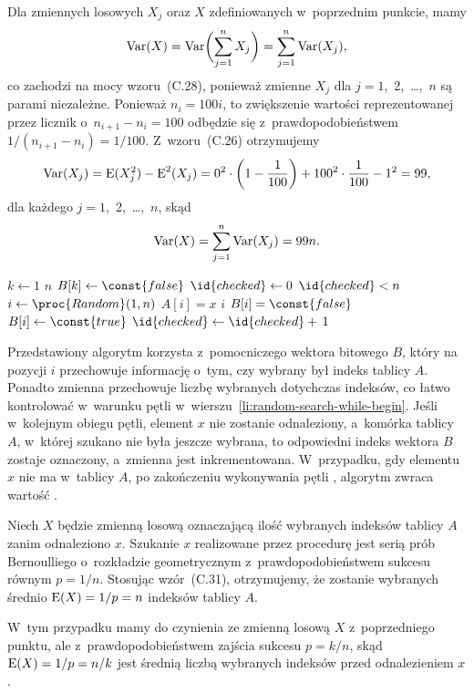 \subproblem %
Dla zmiennych losowych $X_j$ oraz $X$ zdefiniowanych w~poprzednim punkcie, mamy
\[
	\operatorname{Var}(X) = \operatorname{Var}\biggl(\sum_{j=1}^nX_j\biggr) = \sum_{j=1}^n\operatorname{Var}(X_j),
\]
co zachodzi na mocy wzoru~(C.28), ponieważ zmienne $X_j$ dla $j=1$,~2,~\dots,~$n$ są parami niezależne. Ponieważ $n_i=100i$, to zwiększenie wartości reprezentowanej przez licznik o~$n_{i+1}-n_i=100$ odbędzie się z~prawdopodobieństwem $1/(n_{i+1}-n_i)=1/100$. Z~wzoru~(C.26) otrzymujemy
\[
	\operatorname{Var}(X_j) = \operatorname{E}(X_j^2)-\operatorname{E}^2(X_j) = 0^2\cdot\left(1-\frac{1}{100}\right)+100^2\cdot\frac{1}{100}-1^2 = 99,
\]
dla każdego $j=1$,~2,~\dots,~$n$, skąd
\[
	\operatorname{Var}(X) = \sum_{j=1}^n\operatorname{Var}(X_j) = 99n.
\]


\subproblem %
\begin{codebox}
\li	\For $k\gets1$ \To $n$
\li		\Do
			$B[k]\gets\const{false}$
		\End
\li	$\id{checked}\gets0$
\li	\While $\id{checked}<n$ \label{li:random-search-while-begin}
\li		\Do
			$i\gets\proc{Random}(1,n)$
\li			\If $A[i]=x$
\li				\Then
					\Return $i$
\li				\ElseIf $B[i]=\const{false}$
\li					\Then
						$B[i]\gets\const{true}$
\li						$\id{checked}\gets\id{checked}+\,1$
				\End
		\End
\li	\Return {}
\end{codebox}
Przedstawiony algorytm korzysta z~pomocniczego wektora bitowego $B$, który na pozycji $i$ przechowuje informację o~tym, czy wybrany był  indeks tablicy $A$. Ponadto zmienna  przechowuje liczbę wybranych dotychczas indeksów, co łatwo kontrolować w~warunku pętli  w~wierszu~\ref{li:random-search-while-begin}. Jeśli w~kolejnym obiegu pętli, element $x$ nie zostanie odnaleziony, a~komórka tablicy $A$, w~której szukano nie była jeszcze wybrana, to odpowiedni indeks wektora $B$ zostaje oznaczony, a~zmienna  jest inkrementowana. W~przypadku, gdy elementu $x$ nie ma w~tablicy $A$, po zakończeniu wykonywania pętli , algorytm zwraca wartość .

\subproblem %
Niech $X$ będzie zmienną losową oznaczającą ilość wybranych indeksów tablicy $A$ zanim odnaleziono $x$. Szukanie $x$ realizowane przez procedurę  jest serią prób Bernoulliego o~rozkładzie geometrycznym z~prawdopodobieństwem sukcesu równym $p=1/n$. Stosując wzór~(C.31), otrzymujemy, że zostanie wybranych średnio $\operatorname{E}(X)=1/p=n$ indeksów tablicy $A$.

\subproblem %
W~tym przypadku mamy do czynienia ze zmienną losową $X$ z~poprzedniego punktu, ale z~prawdopodobieństwem zajścia sukcesu $p=k/n$, skąd $\operatorname{E}(X)=1/p=n/k$ jest średnią liczbą wybranych indeksów przed odnalezieniem $x$.

